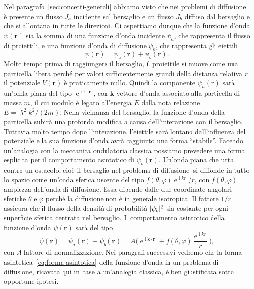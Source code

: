\documentclass[a4paper,fleqn,twoside,12pt]{article}
\renewcommand{\phi}{\varphi}
\DeclareMathOperator{\e}{\mathrm{e}} %
\DeclareMathOperator{\uimm}{\mathrm{i}} %
\DeclarePairedDelimiter{\abs}{\lvert}{\rvert}
\begin{document}
Nel paragrafo~\ref{sec:concetti-generali} abbiamo visto che nei problemi di
diffusione è presente un flusso $J_{a}$ incidente sul bersaglio e un flusso
$J_{b}$ diffuso dal bersaglio e che si allontana in tutte le direzioni.  Ci
aspettiamo dunque che la funzione d'onda $\psi(\bm{r})$ sia la somma di una
funzione d'onda incidente $\psi_{a}$, che rappresenta il flusso di proiettili, e
una funzione d'onda di diffusione $\psi_{b}$, che rappresenta gli eiettili
\begin{equation}
  \psi(\bm{r}) = \psi_{a}(\bm{r}) + \psi_{b}(\bm{r}).
\end{equation}
Molto tempo prima di raggiungere il bersaglio, il proiettile si muove come una
particella libera perché per valori sufficientemente grandi della distanza
relativa $r$ il potenziale $V(\bm{r})$ è praticamente nullo.  Quindi la
componente $\psi_{a}(\bm{r})$ sarà un'onda piana del tipo
$\e^{\uimm \bm{k}\cdot\bm{r}}$, con $\bm{k}$ vettore d'onda associato alla
particella di massa $m$, il cui modulo è legato all'energia $E$ dalla nota
relazione $E = \hslash^{2}k^{2}/(2m)$.  Nella vicinanza del bersaglio, la
funzione d'onda della particella subirà una profonda modifica a causa
dell'interazione con il bersaglio.  Tuttavia molto tempo dopo l'interazione,
l'eiettile sarà lontano dall'influenza del potenziale e la sua funzione d'onda
avrà raggiunto una forma ``stabile''.  Facendo un'analogia con la meccanica
ondulatoria classica possiamo prevedere una forma esplicita per il comportamento
asintotico di $\psi_{b}(\bm{r})$.  Un'onda piana che urta contro un ostacolo,
cioè il bersaglio nel problema di diffusione, si diffonde in tutto lo spazio
come un'onda sferica uscente del tipo $f(\theta,\phi)\e^{\uimm kr}/r$, con
$f(\theta,\phi)$ ampiezza dell'onda di diffusione.  Essa dipende dalle due
coordinate angolari sferiche $\theta$ e $\phi$ perché la diffusione non è in
generale isotropica.  Il fattore $1/r$ assicura che il flusso della densità di
probabilità $\abs{\psi_{b}}^{2}$ sia costante per ogni superficie sferica
centrata nel bersaglio.  Il comportamento asintotico della funzione d'onda
$\psi(\bm{r})$ sarà del tipo
\begin{equation}
  \label{eq:forma-asintotica}
  \psi(\bm{r}) = \psi_{a}(\bm{r}) + \psi_{b}(\bm{r}) =A \bigg( \e^{\uimm
    \bm{k}\cdot\bm{r}} + f(\theta,\phi)\frac{\e^{\uimm kr}}{r} \bigg),
\end{equation}
con $A$ fattore di normalizzazione.  Nei paragrafi successivi vedremo che la
forma asintotica~\eqref{eq:forma-asintotica} della funzione d'onda in un
problema di diffusione, ricavata qui in base a un'analogia classica, è ben
giustificata sotto opportune ipotesi.
\end{document}

